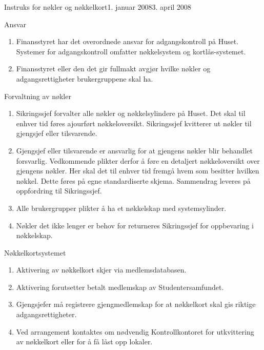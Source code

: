 \begin{instruks}{Instruks for nøkler og nøkkelkort}{1. januar 2008}{3. april 2008}
    \begin{instruksledd}{Ansvar}
        \begin{enumerate}
            \item Finansstyret har det overordnede ansvar for adgangskontroll på Huset.
                Systemer for adgangskontroll omfatter
                nøkkelsystem og kortlås-systemet.
            \item Finansstyret eller den det gir fullmakt avgjør hvilke nøkler og
                adgangsrettigheter brukergruppene skal ha.
        \end{enumerate}
    \end{instruksledd}

    \begin{instruksledd}{Forvaltning av nøkler}
        \begin{enumerate}
            \item Sikringssjef forvalter alle nøkler og nøkkelsylindere på Huset. Det skal til enhver
                tid føres ajourført
                nøkkeloversikt. Sikringssjef kvitterer ut nøkler til gjengsjef eller tilsvarende.
            \item Gjengsjef eller tilsvarende er ansvarlig for at gjengens nøkler blir behandlet
                forsvarlig. Vedkommende plikter
                derfor å føre en detaljert nøkkeloversikt over gjengens nøkler. Her skal det til
                enhver tid fremgå hvem som
                besitter hvilken nøkkel. Dette føres på egne standardiserte skjema. Sammendrag leveres
                på oppfordring til
                Sikringssjef.
            \item Alle brukergrupper plikter å ha et nøkkelskap med systemsylinder.
            \item  Nøkler det ikke lenger er behov for returneres Sikringssjef for oppbevaring i
                nøkkelskap.
        \end{enumerate}
    \end{instruksledd}

    \begin{instruksledd}{Nøkkelkortsystemet}
        \begin{enumerate}
            \item Aktivering av nøkkelkort skjer via medlemsdatabasen.
            \item Aktivering forutsetter betalt medlemskap av Studentersamfundet.
            \item Gjengsjefer må registrere gjengmedlemskap for at nøkkelkort skal gis riktige
                adgangsrettigheter.
            \item Ved arrangement kontaktes om nødvendig Kontrollkontoret for utkvittering av
                nøkkelkort eller for å få låst
                opp lokaler.
        \end{enumerate}
    \end{instruksledd}


\end{instruks}
